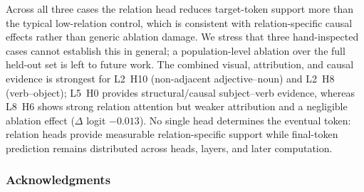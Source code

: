 \documentclass{article} %
\begin{document}
\begin{table}[H]
\centering
\small
{}
\caption{Causal ablation results comparing selected high-relation heads against low-relation control heads. ``Controls $\geq$ winner'' reports the fraction of control heads whose target-logit drop was at least as negative as the selected head's drop. Lower values indicate stronger relation-specific causal evidence.}
\label{tab:mini_control_ablation}
\end{table}

Across all three cases the relation head reduces target-token support more than the typical low-relation control, which is consistent with relation-specific causal effects rather than generic ablation damage. We stress that three hand-inspected cases cannot establish this in general; a population-level ablation over the full held-out set is left to future work. The combined visual, attribution, and causal evidence is strongest for L2~H10 (non-adjacent adjective--noun) and L2~H8 (verb--object); L5~H0 provides structural/causal subject--verb evidence, whereas L8~H6 shows strong relation attention but weaker attribution and a negligible ablation effect ($\Delta$ logit $-0.013$). No single head determines the eventual token: relation heads provide measurable relation-specific support while final-token prediction remains distributed across heads, layers, and later computation.

\subsubsection*{Acknowledgments}
\end{document}
